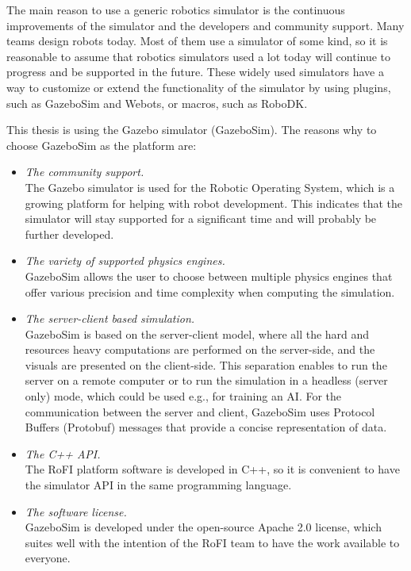 \documentclass[
  printed, %
  color,   %
  notable, %
  oneside, %
  nolof,   %
  nolot,   %
  nocover,
]{fithesis3}
\begin{document}
The main reason to use a generic robotics simulator is the continuous improvements of the simulator and the developers and community support.
Many teams design robots today.
Most of them use a simulator of some kind, so it is reasonable to assume that robotics simulators used a lot today will continue to progress and be supported in the future.
These widely used simulators have a way to customize or extend the functionality of the simulator by using plugins, such as GazeboSim\cite{gazebo} and Webots\cite{webots}, or macros, such as RoboDK\cite{robodk}.

This thesis is using the Gazebo simulator (GazeboSim).
The reasons why to choose GazeboSim as the platform are:
\begin{itemize}
    \item \emph{The community support.}\\
    The Gazebo simulator is used for the Robotic Operating System\cite{ros}, which is a growing platform for helping with robot development.
    This indicates that the simulator will stay supported for a significant time and will probably be further developed.
    \item \emph{The variety of supported physics engines.}\\
    GazeboSim allows the user to choose between multiple physics engines that offer various precision and time complexity when computing the simulation.
    \item \emph{The server-client based simulation.}\\
    GazeboSim is based on the server-client model, where all the hard and resources heavy computations are performed on the server-side, and the visuals are presented on the client-side.
    This separation enables to run the server on a remote computer or to run the simulation in a headless (server only) mode, which could be used e.g., for training an AI.
    For the communication between the server and client, GazeboSim uses Protocol Buffers (Protobuf)\cite{protobuf} messages that provide a concise representation of data.
    \item \emph{The C++ API.}\\
    The RoFI platform software is developed in C++, so it is convenient to have the simulator API in the same programming language.
    \item \emph{The software license.}\\
    GazeboSim is developed under the open-source Apache 2.0 license, which suites well with the intention of the RoFI team to have the work available to everyone.
\end{itemize}
\end{document}
